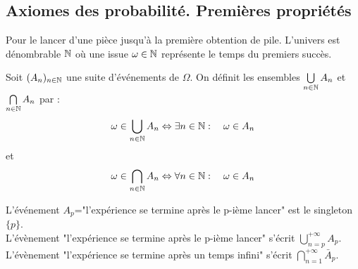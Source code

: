 \documentclass{book}
\begin{document}
\subsection{Axiomes des probabilité. Premières propriétés}
\begin{Exemple}
Pour le lancer d'une pièce jusqu'à la première obtention de pile. L'univers est dénombrable $\mathbb{N}$ où une issue $\omega\in \mathbb{N}$ représente le temps du premiers succès.
\end{Exemple}
\begin{Definition}
Soit $(A_n )_{n\in \mathbb{N}}$ une suite d'événements de $\Omega$. On définit les ensembles $\bigcup\limits_{n\in\mathbb{N}}A_n$ et $\bigcap\limits_{n\in\mathbb{N}}A_n$ par :
$$ \omega  \in \bigcup\limits_{n\in\mathbb{N}}A_n \Leftrightarrow \exists n\in\mathbb{N}:\quad \omega \in A_n$$ 
et 
$$ \omega  \in \bigcap\limits_{n\in\mathbb{N}}A_n \Leftrightarrow \forall n\in\mathbb{N}:\quad \omega \in A_n$$ 
\end{Definition}
\begin{Exemple}
L'événement $A_p$="l'expérience se termine après le p-ième lancer" est le singleton $\{p\}$.\\
L'évènement "l'expérience se termine après le p-ième lancer" s'écrit $\bigcup\limits_{n=p}^{+\infty}A_p$.\\
L'évènement "l'expérience se termine après un temps infini" s'écrit $\bigcap\limits_{n=1}^{+\infty} \bar A_p$.
\end{Exemple}
\end{document}

